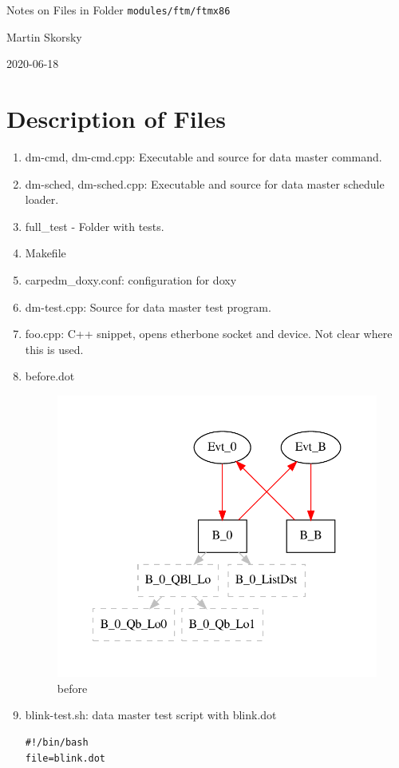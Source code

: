 \documentclass[12pt,a4paper]{report}
\begin{document}
\begin{titlepage}
\vspace{2cm}
\begin{center}
\Huge{Notes on Files in Folder \texttt{modules/ftm/ftmx86}}

\Large{Martin Skorsky}

\Large{2020-06-18}
\end{center}
\vfill
\end{titlepage}

\tableofcontents

\chapter{Description of Files}

\begin{enumerate}
\item dm-cmd, dm-cmd.cpp: Executable and source for data master command.
\item dm-sched, dm-sched.cpp: Executable and source for data master schedule loader.
\item full\_test - Folder with tests.
\item Makefile
\item carpedm\_doxy.conf: configuration for doxy
\item dm-test.cpp: Source for data master test program.
\item foo.cpp: C++ snippet, opens etherbone socket and device. Not clear where this is used.
\item before.dot
    \begin{figure}
        \centering 
        \includegraphics{TestPattern/before.pdf}
        \caption{before}
        \label{fig:before}
    \end{figure}
\item blink-test.sh: data master test script with blink.dot
\begin{verbatim}
#!/bin/bash
file=blink.dot


\end{verbatim}
\end{enumerate}
\end{document}
